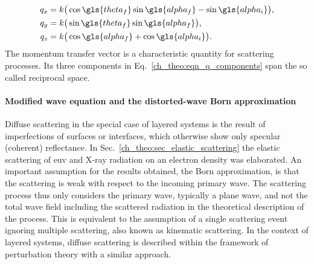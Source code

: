 \begin{align}\begin{split}
q_x &= k \big( \cos \gls{theta_f} \sin \gls{alpha_f} - \sin \gls{alpha_i}\big)\text{,}\\
q_y &= k \big( \sin \gls{theta_f} \sin \gls{alpha_f}\big)\text{,}\\
q_z &= k \big( \cos \gls{alpha_f} + \cos \gls{alpha_i}\big)\text{.}
\end{split} \label{ch_theo:eqn_q_components}
\end{align}
The momentum transfer vector is a characteristic quantity for scattering processes. Its three components in Eq.~\eqref{ch_theo:eqn_q_components} span the so called reciprocal space.

\paragraph{Modified wave equation and the distorted-wave Born approximation}
Diffuse scattering in the special case of layered systems is the result of imperfections of surfaces or interfaces, which otherwise show only specular (coherent) reflectance. In Sec.~\ref{ch_theo:sec_elastic_scattering} the elastic scattering of \gls{euv} and X-ray radiation on an electron density was elaborated. An important assumption for the results obtained, the Born approximation, is that the scattering is weak with respect to the incoming primary wave. The scattering process thus only considers the primary wave, typically a plane wave, and not the total wave field including the scattered radiation in the theoretical description of the process. This is equivalent to the assumption of a single scattering event ignoring multiple scattering, also known as kinematic scattering. In the context of layered systems, diffuse scattering is described within the framework of perturbation theory with a similar approach.

